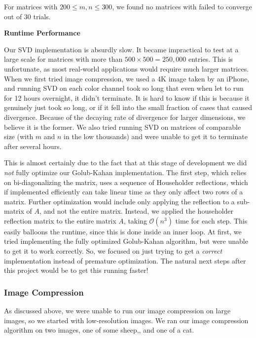 For matrices with $200 \leq m, n \leq 300$, we found no matrices with failed to converge out of 30 trials.

\begin{center}
    \textbf{Runtime Performance}
\end{center}

Our SVD implementation is absurdly slow. It became impractical to test at a large scale for matrices with more than 
$500 \times 500 = 250,000$ entries. This is unfortunate, as most real-world applications would require much larger 
matrices. When we first tried image compression, we used a 4K image taken by an iPhone, and running SVD on 
each color channel took so long that even when let to run for 12 hours overnight, it didn't terminate. It is hard to 
know if this is because it genuinely just took so long, or if it fell into the small fraction of cases that caused 
divergence. Because of the decaying rate of divergence for larger dimensions, we believe it is the former. We also 
tried running SVD on matrices of comparable size (with $m$ and $n$ in the low thousands) and were unable to get 
it to terminate after several hours.

This is almost certainly due to the fact that at this stage of development we did \emph{not} fully optimize our 
Golub-Kahan implementation. The first step, which relies on bi-diagonalizing the matrix, uses a sequence of Householder 
reflections, which if implemented efficiently can take linear time as they only affect two rows of a matrix. Further 
optimization would include only applying the reflection to a sub-matrix of $A$, and not the entire matrix. Instead, 
we applied the householder reflection matrix to the entire matrix $A$, taking $\mathcal{O}(n^3)$ time for each step.
This easily balloons the runtime, since this is done inside an inner loop. At first, we tried implementing 
the fully optimized Golub-Kahan algorithm, but were unable to get it to work correctly. So, we focused on just 
trying to get a \emph{correct} implementation instead of premature optimization. The natural next steps after this 
project would be to get this running faster!

\subsubsection{Image Compression}

As discussed above, we were unable to run our image compression on large images, so we started with low-resolution 
images. We ran our image compression algorithm on two images, one of some sheep,\ftntmk{}, and one 
of a cat. 


